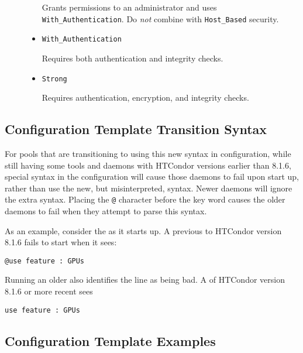 \begin{description}
\begin{itemize}
    Grants permissions to an administrator and uses 
    \texttt{With\_Authentication}.
    Do \emph{not} combine with \texttt{Host\_Based} security.

    \item \texttt{With\_Authentication}

    Requires both authentication and integrity checks.

    \item \texttt{Strong}

    Requires authentication, encryption, and integrity checks.
  \end{itemize}

\end{description}

\subsection{\label{sec:Config-Template-Transition-Syntax}Configuration
Template Transition Syntax}

For pools that are transitioning to using this new syntax in configuration,
while still having some tools and daemons with HTCondor versions 
earlier than 8.1.6,
special syntax in the configuration will cause those daemons to
fail upon start up,
rather than use the new, but misinterpreted, syntax. 
Newer daemons will ignore the extra syntax.
Placing the \verb|@| character before the  key word
causes the older daemons to fail when they attempt to
parse this syntax.

As an example, consider the  as it starts up.
A  previous to HTCondor version 8.1.6 fails to start
when it sees:
\begin{verbatim}
@use feature : GPUs
\end{verbatim}
Running an older  also identifies the 
line as being bad.
A  of HTCondor version 8.1.6 or more recent sees
\begin{verbatim}
use feature : GPUs
\end{verbatim}

\subsection{\label{sec:Config-Template-Examples}Configuration Template
Examples}

